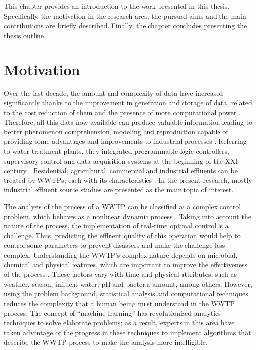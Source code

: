 This chapter provides an introduction to the work presented in this thesis. Specifically, the motivation in the research area, the pursued aims and the main contributions are briefly described. Finally, the chapter concludes presenting the thesis outline.

\section{Motivation}
\label{s:Motivation}

Over the last decade, the amount and complexity of data have increased significantly thanks to the improvement in generation and storage of data, related to the cost reduction of them and the presence of more computational power \cite{Romero2017}. Therefore, all this data now available can produce valuable information leading to better phenomenon comprehension, modeling and reproduction capable of providing some advantages and improvements to industrial processes \cite{Sbroiavacca2018}. Referring to water treatment plants, they integrated programmable logic controllers, supervisory control and data acquisition systems at the beginning of the XXI century \cite{Newhart2019}. Residential, agricultural, commercial and industrial effluents can be treated by WWTPs, each with its characteristics \cite{Nourani2018}. In the present research, mostly industrial effluent source studies are presented as the main topic of interest.

The analysis of the process of a WWTP can be classified as a complex control problem, which behaves as a nonlinear dynamic process \cite{Pang2019}. Taking into account the nature of the process, the implementation of real-time optimal control is a challenge. Thus, predicting the effluent quality of this operation would help to control some parameters to prevent disasters and make the challenge less complex. Understanding the WWTP’s complex nature depends on microbial, chemical and physical features, which are important to improve the effectiveness of the process \cite{Li2013}. These factors vary with time and physical attributes, such as weather, season, influent water, pH and bacteria amount, among others. However, using the problem background, statistical analysis and computational techniques reduces the complexity that a human being must understand in the WWTP process. The concept of “machine learning” has revolutionized analytics techniques to solve elaborate problems; as a result, experts in this area have taken advantage of the progress in these techniques to implement algorithms that describe the WWTP process to make the analysis more intelligible.


